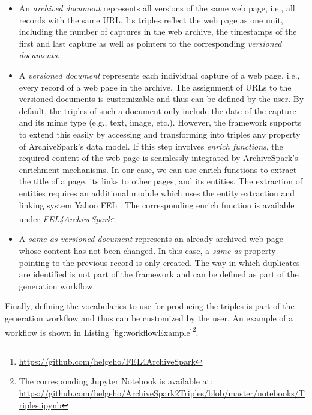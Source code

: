 \documentclass[twocolumn]{svjour3}
\begin{document}
\begin{itemize}
\item
An \textit{archived document} represents all versions of the same web page,
i.e., all records with the same URL.
Its triples reflect the web page as one unit,
including the number of captures in the web archive,
the timestamps of the first and last capture as well as pointers to
the corresponding \textit{versioned documents}.

\item
A \textit{versioned document} represents each individual capture of a web page,
i.e., every record of a web page in the archive.
The assignment of URLs to the versioned documents is customizable and thus can be defined by the user.
By default, the triples of such a document only include the date of the capture
and its mime type (e.g., text, image, etc.).
However, the framework supports to extend this easily
by accessing and transforming into triples any property of ArchiveSpark's data model.
If this step involves \textit{enrich functions},
the required content of the
web page is seamlessly integrated by ArchiveSpark's en\-ri\-ch\-ment me\-cha\-nisms.
In our case, we can use enrich functions to extract the title of a page, its
links to other pages, and its entities.
The extraction of entities requires an additional module
which uses the entity extraction and linking system Yahoo FEL \cite{BlancoWSDM2015}.
The corresponding enrich function is available
under {\em FEL4\-Archi\-ve\-Spark}\footnote{\url{https://github.com/helgeho/FEL4ArchiveSpark}}.

\item
A \textit{same-as versioned document} represents
an already archived web page whose content has not been changed.
In this case, a {\em same-as} property pointing to the previous record
is only created. The way in which duplicates are identified
is not part of the framework and can be defined as part of the generation workflow.
\end{itemize}

Finally, defining the vocabularies to use for producing the triples is part of the
generation workflow and thus can be customized by the user.
An example of a workflow is shown in Listing \ref{fig:workflowExample}\footnote{The
corresponding Jupyter Notebook is available at: \url{https://github.com/helgeho/ArchiveSpark2Triples/blob/master/notebooks/Triples.ipynb}}.

\renewcommand{\figurename}{Listing}
\setcounter{figure}{0}
\end{document}
